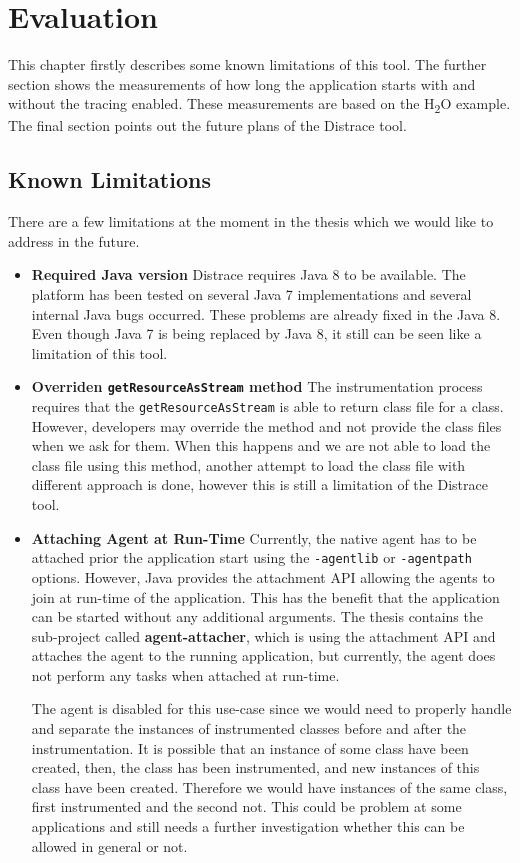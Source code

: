 \chapter{Evaluation}
\label{chap:evaluation}
This chapter firstly describes some known limitations of this tool. The further section shows the measurements of how long the application starts with and without the tracing enabled. These measurements are based on the H\textsubscript{2}O example. The final section points out the future plans of the Distrace tool.
\section{Known Limitations}
There are a few limitations at the moment in the thesis which we would like to address in the future.
\begin{itemize}
	\item \textbf{Required Java version} \newline
	Distrace requires Java 8 to be available. The platform has been tested on several Java 7 implementations and several internal Java bugs occurred. These problems are already fixed in the Java 8. Even though Java 7 is being replaced by Java 8, it still can be seen like a limitation of this tool.
	\item \textbf{Overriden \texttt{getResourceAsStream} method} \newline
	The instrumentation process requires that the \texttt{getResourceAsStream} is able to return class file for a class. However, developers may override the method and not provide the class files when we ask for them. When this happens and we are not able to load the class file using this method, another attempt to load the class file with different approach is done, however this is still a limitation of the Distrace tool.
	
	\item \textbf{Attaching Agent at Run-Time} \newline
	Currently, the native agent has to be attached prior the application start using the \texttt{-agentlib} or \texttt{-agentpath} options. However, Java provides the attachment API allowing the agents to join at run-time of the application. This has the benefit that the application can be started without any additional arguments. The thesis contains the sub-project called \textbf{agent-attacher}, which is using the attachment API and attaches the agent to the running application, but currently, the agent does not perform any tasks when attached at run-time.
	
	The agent is disabled for this use-case since we would need to properly handle and separate the instances of instrumented classes before and after the instrumentation. It is possible that an instance of some class have been created, then, the class has been instrumented, and new instances of this class have been created. Therefore we would have instances of the same class, first instrumented and the second not. This could be problem at some applications and still needs a further investigation whether this can be allowed in general or not.
	
\end{itemize}



